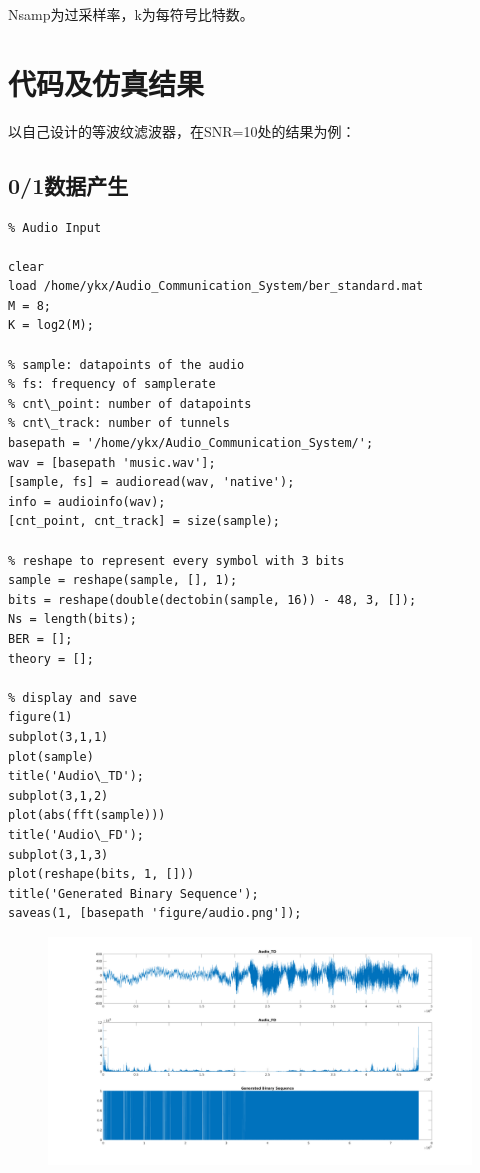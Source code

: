 \begin{spacing}{1.5}
Nsamp为过采样率，k为每符号比特数。


\section{代码及仿真结果}

以自己设计的等波纹滤波器，在SNR=10处的结果为例：

\subsection{0/1数据产生}
\begin{lstlisting}
% Audio Input

clear
load /home/ykx/Audio_Communication_System/ber_standard.mat
M = 8;
K = log2(M);

% sample: datapoints of the audio
% fs: frequency of samplerate
% cnt\_point: number of datapoints
% cnt\_track: number of tunnels
basepath = '/home/ykx/Audio_Communication_System/';
wav = [basepath 'music.wav'];
[sample, fs] = audioread(wav, 'native');
info = audioinfo(wav);
[cnt_point, cnt_track] = size(sample);

% reshape to represent every symbol with 3 bits
sample = reshape(sample, [], 1);
bits = reshape(double(dectobin(sample, 16)) - 48, 3, []);
Ns = length(bits);
BER = [];   
theory = [];

% display and save
figure(1)
subplot(3,1,1)
plot(sample)
title('Audio\_TD');
subplot(3,1,2)
plot(abs(fft(sample)))
title('Audio\_FD');
subplot(3,1,3)
plot(reshape(bits, 1, []))
title('Generated Binary Sequence');
saveas(1, [basepath 'figure/audio.png']);
\end{lstlisting}

\begin{figure}[H]
\centering{}
\includegraphics[width = 1\columnwidth]{audio.png}
\end{figure}


\end{spacing}

